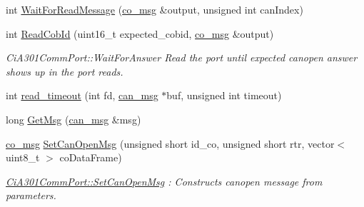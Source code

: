 \begin{DoxyCompactItemize}
\item 
int \hyperlink{classCiA301CommPort_a02ba7069a0497e3497f3dfaec2879b54}{Wait\+For\+Read\+Message} (\hyperlink{structco__msg}{co\+\_\+msg} \&output, unsigned int can\+Index)
\item 
int \hyperlink{classCiA301CommPort_a408f53d13935a1916ca6f21d08ae135e}{Read\+Cob\+Id} (uint16\+\_\+t expected\+\_\+cobid, \hyperlink{structco__msg}{co\+\_\+msg} \&output)
\begin{DoxyCompactList}\small\item\em Ci\+A301\+Comm\+Port\+::\+Wait\+For\+Answer Read the port until expected canopen answer shows up in the port reads. \end{DoxyCompactList}\item 
int \hyperlink{classCiA301CommPort_ae62c2389b38a0e217aff7ca17a3d87b6}{read\+\_\+timeout} (int fd, \hyperlink{structcan__msg}{can\+\_\+msg} $\ast$buf, unsigned int timeout)
\item 
long \hyperlink{classCiA301CommPort_a645450ca09e07ea6da339923ceeec934}{Get\+Msg} (\hyperlink{structcan__msg}{can\+\_\+msg} \&msg)
\item 
\hyperlink{structco__msg}{co\+\_\+msg} \hyperlink{classCiA301CommPort_a2c197480112989df6bdb9ea89a649636}{Set\+Can\+Open\+Msg} (unsigned short id\+\_\+co, unsigned short rtr, vector$<$ uint8\+\_\+t $>$ co\+Data\+Frame)
\begin{DoxyCompactList}\small\item\em \hyperlink{classCiA301CommPort_a2c197480112989df6bdb9ea89a649636}{Ci\+A301\+Comm\+Port\+::\+Set\+Can\+Open\+Msg} \+: Constructs canopen message from parameters. \end{DoxyCompactList}\end{DoxyCompactItemize}
